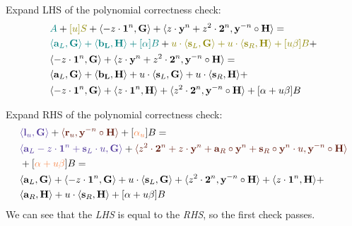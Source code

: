 \documentclass[../lecture-notes-148x210.tex]{subfiles}
\begin{document}
Expand LHS of the polynomial correctness check:
\begin{equation*}
    \begin{aligned}
        &\textcolor{teal}{A} + \textcolor{olive}{[u]S} + \langle -z \cdot \mathbf{1}^n, \mathbf{G} \rangle + \langle z \cdot \mathbf{y}^n + z^2 \cdot \mathbf{2}^n, \mathbf{y}^{-n} \circ \mathbf{H} \rangle = \\
        &\textcolor{teal}{\langle \mathbf{a}_L, \mathbf{G} \rangle + \langle \mathbf{b_L}, \mathbf{H} \rangle + [\alpha]B} + \textcolor{olive}{u \cdot \langle \mathbf{s}_L, \mathbf{G} \rangle + u \cdot \langle \mathbf{s}_R, \mathbf{H} \rangle + [u\beta]B} + \\
        & \langle -z \cdot \mathbf{1}^n, \mathbf{G} \rangle + \langle z \cdot \mathbf{y}^n + z^2 \cdot \mathbf{2}^n, \mathbf{y}^{-n} \circ \mathbf{H} \rangle = \\
        &\langle \mathbf{a}_L, \mathbf{G} \rangle + \langle \mathbf{b_L}, \mathbf{H} \rangle + u \cdot \langle \mathbf{s}_L, \mathbf{G} \rangle + u \cdot \langle \mathbf{s}_R, \mathbf{H} \rangle + \\
        &\langle -z \cdot \mathbf{1}^n, \mathbf{G} \rangle + \langle z \cdot \mathbf{1}^n, \mathbf{H} \rangle + \langle z^2 \cdot \mathbf{2}^n, \mathbf{y}^{-n} \circ \mathbf{H} \rangle + [\alpha + u\beta]B
    \end{aligned}
\end{equation*}

Expand RHS of the polynomial correctness check:
\begin{equation*}
    \begin{aligned}
        &\textcolor{Violet}{\langle \mathbf{l}_u, \mathbf{G} \rangle} + \textcolor{Sepia}{\langle \mathbf{r}_u, \mathbf{y}^{-n} \circ \mathbf{H} \rangle} + [\textcolor{Peach}{\alpha_u}]B = \\
        &\textcolor{Violet}{\langle \mathbf{a}_L - z \cdot \mathbf{1}^n + \mathbf{s}_L \cdot u, \mathbf{G} \rangle} + \textcolor{Sepia}{\langle z^2 \cdot \mathbf{2}^n + z \cdot \mathbf{y}^n + \mathbf{a}_R \circ \mathbf{y}^n + \mathbf{s}_R \circ \mathbf{y}^n \cdot u, \mathbf{y}^{-n} \circ \mathbf{H} \rangle} \\ 
        &+ [\textcolor{Peach}{\alpha + u\beta}]B = \\
        & \langle \mathbf{a}_L, \mathbf{G} \rangle + \langle -z \cdot \mathbf{1}^n, \mathbf{G} \rangle + u \cdot \langle \mathbf{s}_L, \mathbf{G} \rangle + \langle z^2 \cdot \mathbf{2}^n, \mathbf{y}^{-n} \circ \mathbf{H} \rangle + \langle z \cdot \mathbf{1}^n, \mathbf{H} \rangle + \\
        & \langle \mathbf{a}_R, \mathbf{H} \rangle + u\cdot \langle \mathbf{s}_R, \mathbf{H} \rangle + [\alpha + u\beta]B
    \end{aligned}
\end{equation*}
We can see that the \textit{LHS} is equal to the \textit{RHS}, so the first check passes.
\end{document}
